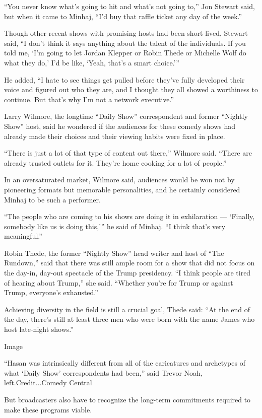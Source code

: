 ``You never know what's going to hit and what's not going to,'' Jon
Stewart said, but when it came to Minhaj, ``I'd buy that raffle ticket
any day of the week.''

Though other recent shows with promising hosts had been short-lived,
Stewart said, ``I don't think it says anything about the talent of the
individuals. If you told me, `I'm going to let Jordan Klepper or Robin
Thede or Michelle Wolf do what they do,' I'd be like, `Yeah, that's a
smart choice.'''

He added, ``I hate to see things get pulled before they've fully
developed their voice and figured out who they are, and I thought they
all showed a worthiness to continue. But that's why I'm not a network
executive.''

Larry Wilmore, the longtime ``Daily Show'' correspondent and former
``Nightly Show'' host, said he wondered if the audiences for these
comedy shows had already made their choices and their viewing habits
were fixed in place.

``There is just a lot of that type of content out there,'' Wilmore said.
``There are already trusted outlets for it. They're home cooking for a
lot of people.''

In an oversaturated market, Wilmore said, audiences would be won not by
pioneering formats but memorable personalities, and he certainly
considered Minhaj to be such a performer.

``The people who are coming to his shows are doing it in exhilaration
--- `Finally, somebody like us is doing this,''' he said of Minhaj. ``I
think that's very meaningful.''

Robin Thede, the former ``Nightly Show'' head writer and host of ``The
Rundown,'' said that there was still ample room for a show that did not
focus on the day-in, day-out spectacle of the Trump presidency. ``I
think people are tired of hearing about Trump,'' she said. ``Whether
you're for Trump or against Trump, everyone's exhausted.''

Achieving diversity in the field is still a crucial goal, Thede said:
``At the end of the day, there's still at least three men who were born
with the name James who host late-night shows.''

Image

``Hasan was intrinsically different from all of the caricatures and
archetypes of what `Daily Show' correspondents had been,'' said Trevor
Noah, left.Credit...Comedy Central

But broadcasters also have to recognize the long-term commitments
required to make these programs viable.

